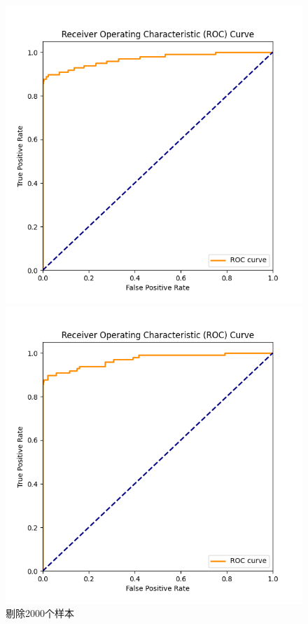 \documentclass[8pt]{article}
\begin{document}
\begin{figure}[H]
    \centering
    \begin{minipage}{0.32\textwidth}
        \centering
        \includegraphics[width=\textwidth]{../Prob1/out/rand_seed_14/task2/roc_curve_remove2000.png}
        \caption{剔除2000个样本}
        \label{fig:roc_curve_remove2000}
    \end{minipage}
    \hfill
    \begin{minipage}{0.32\textwidth}
        \centering
        \includegraphics[width=\textwidth]{../Prob1/out/rand_seed_14/task2/roc_curve_remove20000.png}

\end{minipage}
\end{figure}
\end{document}
